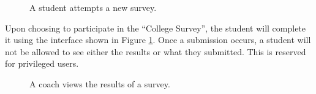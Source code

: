 \begin{figure}[h!]
	\centering
	\caption{A student attempts a new survey.}
	\label{fig:screens-survey-show}
\end{figure}

Upon choosing to participate in the ``College Survey'', the student will complete it using the interface shown in Figure \ref{fig:screens-survey-show}. Once a submission occurs, a student will not be allowed to see either the results or what they submitted. This is reserved for privileged users.

\begin{figure}[h!]
	\centering
	\caption{A coach views the results of a survey.}
	\label{fig:screens-survey-results}
\end{figure}

